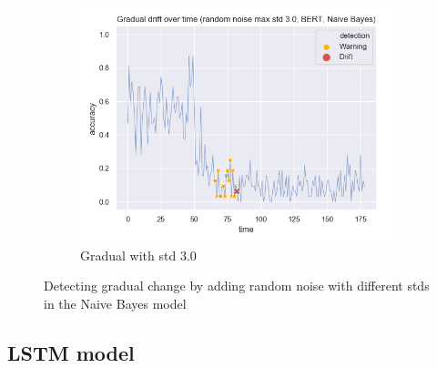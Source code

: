 \documentclass[12pt]{extreport}
\begin{document}
\begin{figure}[H]
\begin{subfigure}{.5\textwidth}
  \centering
  \includegraphics[width=\linewidth]{assets/detecting-change/gradual_noise_random_std_3_nb_wos_1_BERT.png}
  \caption{Gradual with std 3.0}
  \label{fig:nb-gradual-std-3}
\end{subfigure}
\caption{Detecting gradual change by adding random noise with different stds in the Naive Bayes model}
\label{fig:nb-gradual}
\end{figure}

\subsection{LSTM model}
\end{document}
